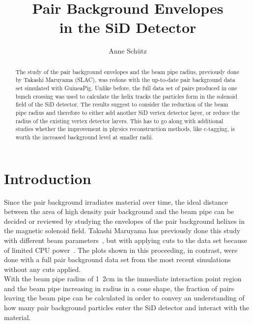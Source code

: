 \documentclass[12pt]{article}
\newcommand{\guineapig}{GuineaPig\xspace}
\begin{document}

\title{Pair Background Envelopes\\in the SiD Detector}

\author[1,2]{Anne Sch\"utz}


\maketitle

\linenumbers

\begin{abstract}
The study of the pair background envelopes and the beam pipe radius, previously done by Takashi Maruyama (SLAC), was redone with the up-to-date pair background data set simulated with \guineapig.
Unlike before, the full data set of pairs produced in one bunch crossing was used to calculate the helix tracks the particles form in the solenoid field of the SiD detector.
The results suggest to consider the reduction of the beam pipe radius and therefore to either add another SiD vertex detector layer, or reduce the radius of the existing vertex detector layers.
This has to go along with additional studies whether the improvement in physics reconstruction methods, like c-tagging, is worth the increased background level at smaller radii.
\end{abstract}


\section{Introduction}
\label{sec:introduction}
Since the pair background irradiates material over time, the ideal distance between the area of high density pair background and the beam pipe can be decided or reviewed by studying the envelopes of the pair background helixes in the magnetic solenoid field.
Takashi Maruyama has previously done this study with different beam parameters~\cite{Takashi_plot}, but with applying cuts to the data set because of limited CPU power~\cite{Takashi}.
The plots shown in this proceeding, in contrast, were done with a full pair background data set from the most recent simulations without any cuts applied.\\
With the beam pipe radius of \unit{1.2}{cm} in the immediate interaction point region and the beam pipe increasing in radius in a cone shape, the fraction of pairs leaving the beam pipe can be calculated in order to convey an understanding of how many pair background particles enter the SiD detector and interact with the material. 
\end{document}
